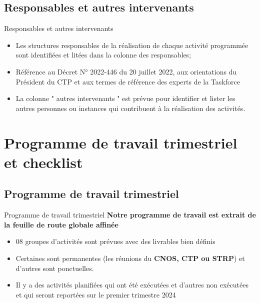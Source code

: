 \documentclass[11pt]{beamer}
\begin{document}
\subsection{\tiny Responsables et autres intervenants}
\begin{frame}{Responsables et autres intervenants}
  \begin{itemize} [<+->]
 \item  Les structures responsables de la réalisation de chaque activité programmée sont identifiées et litées dans la colonne des responsables; \vfill
 \item Référence au Décret N° 2022-446 du 20 juillet 2022, aux orientations du Président du CTP et  aux termes de référence des experts de la Taskforce \vfill
\item  La colonne  " autres intervenants " est prévue pour identifier et lister les autres personnes ou instances qui contribuent à la réalisation des activités. \vfill
 \end{itemize}
\end{frame}




\section{Programme de travail trimestriel et checklist}
\subsection{\tiny Programme de travail trimestriel }
\begin{frame}{Programme de travail trimestriel }
\textbf{Notre programme de travail est extrait de la feuille de route globale affinée}  \vfill 
\begin{itemize} [<+->]
\item  08 groupes d’activités sont prévues avec des livrables bien définis   \vfill
\item Certaines sont permanentes (les réunions du \textbf{CNOS, CTP ou STRP}) et d’autres sont ponctuelles.  \vfill
\item  Il y a des activités planifiées qui ont été exécutées et d’autres non exécutées et qui seront reportées sur le premier trimestre 2024  \vfill
\end{itemize}
\end{frame}
\end{document}
